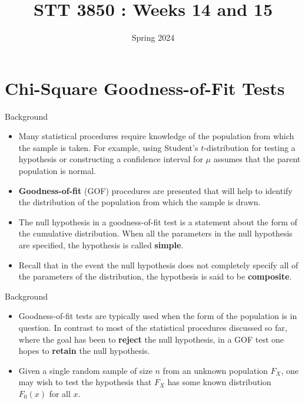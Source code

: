 \documentclass[
  ignorenonframetext,
]{beamer}
\title{STT 3850 : Weeks 14 and 15}
\author{Spring 2024}
\date{}
\institute{Appalachian State University}
\begin{document}
\frame{\titlepage}

\hypertarget{chi-square-goodness-of-fit-tests}{%
\section{Chi-Square Goodness-of-Fit
Tests}\label{chi-square-goodness-of-fit-tests}}

\begin{frame}{Background}
\protect\hypertarget{background}{}
\begin{itemize}
\item
  Many statistical procedures require knowledge of the population from
  which the sample is taken. For example, using Student's
  \(t\)-distribution for testing a hypothesis or constructing a
  confidence interval for \(\mu\) assumes that the parent population is
  normal.
\item
  \textbf{Goodness-of-fit} (GOF) procedures are presented that will help
  to identify the distribution of the population from which the sample
  is drawn.
\item
  The null hypothesis in a goodness-of-fit test is a statement about the
  form of the cumulative distribution. When all the parameters in the
  null hypothesis are specified, the hypothesis is called
  \textbf{simple}.
\item
  Recall that in the event the null hypothesis does not completely
  specify all of the parameters of the distribution, the hypothesis is
  said to be \textbf{composite}.
\end{itemize}
\end{frame}

\begin{frame}{Background}
\protect\hypertarget{background-1}{}
\begin{itemize}
\item
  Goodness-of-fit tests are typically used when the form of the
  population is in question. In contrast to most of the statistical
  procedures discussed so far, where the goal has been to
  \textbf{reject} the null hypothesis, in a GOF test one hopes to
  \textbf{retain} the null hypothesis.
\item
  Given a single random sample of size \(n\) from an unknown population
  \(F_X\), one may wish to test the hypothesis that \(F_X\) has some
  known distribution \(F_0(x)\) for all \(x\).
\end{itemize}
\end{frame}
\end{document}
